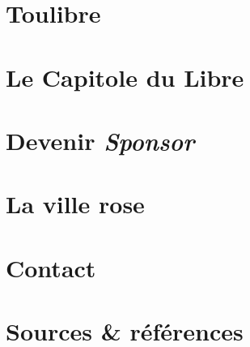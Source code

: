 \documentclass{cdl_sponsor}
\begin{document}
\section{Toulibre}

	

\section{Le Capitole du Libre}

	

\section{Devenir \textit{Sponsor}}

	

\section{La ville rose}

	
	
\section{Contact}

	

\section{Sources \& références}

	
\end{document}
